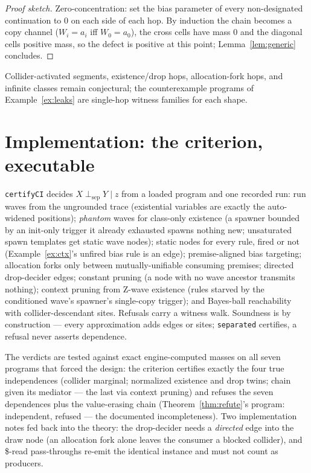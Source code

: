 \documentclass[11pt]{article}
\newcommand{\dsep}{\perp_{\mathrm{sep}}}
\theoremstyle{definition}
\theoremstyle{remark}
\begin{document}
\begin{proof}[Proof sketch]
Zero-concentration: set the bias parameter of every non-designated
continuation to $0$ on each side of each hop.  By induction the chain
becomes a copy channel ($W_i = a_i$ iff $W_0 = a_0$), the cross cells
have mass $0$ and the diagonal cells positive mass, so the defect is
positive at this point; Lemma~\ref{lem:generic} concludes.
\end{proof}

Collider-activated segments, existence/drop hops, allocation-fork
hops, and infinite classes remain conjectural; the counterexample
programs of Example~\ref{ex:leaks} are single-hop witness families for
each shape.

\section{Implementation: the criterion, executable}
\label{sec:impl}

\texttt{certifyCI} decides $X \dsep Y \mid z$ from a loaded program
and one recorded run: run waves from the ungrounded trace (existential
variables are exactly the auto-widened positions); \emph{phantom}
waves for class-only existence (a spawner bounded by an init-only
trigger it already exhausted spawns nothing new; unsaturated spawn
templates get static wave nodes); static nodes for every rule, fired
or not (Example~\ref{ex:ctx}'s unfired bias rule is an edge);
premise-aligned bias targeting; allocation forks only between
mutually-unifiable consuming premises; directed drop-decider edges;
constant pruning (a node with no wave ancestor transmits nothing);
context pruning from Z-wave existence (rules starved by the
conditioned wave's spawner's single-copy trigger); and Bayes-ball
reachability~\cite{Shachter1998} with collider-descendant sites.
Refusals carry a witness walk.  Soundness is by construction --- every
approximation adds edges or sites; \texttt{separated} certifies, a
refusal never asserts dependence.

The verdicts are tested against exact engine-computed masses on all
seven programs that forced the design: the criterion certifies exactly
the four true independences (collider marginal; normalized existence
and drop twins; chain given its mediator --- the last via context
pruning) and refuses the seven dependences plus the value-erasing
chain (Theorem~\ref{thm:refute}'s program: independent, refused ---
the documented incompleteness).  Two implementation notes fed back
into the theory: the drop-decider needs a \emph{directed} edge into
the draw node (an allocation fork alone leaves the consumer a blocked
collider), and \$-read pass-throughs re-emit the identical instance
and must not count as producers.
\end{document}
